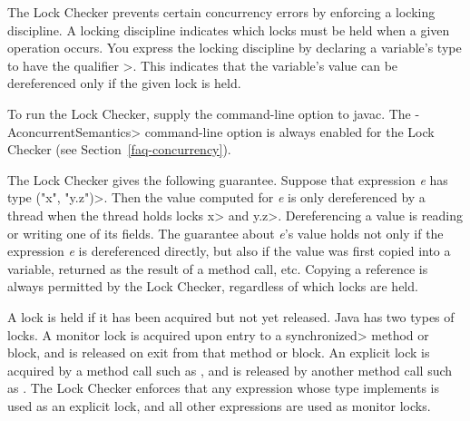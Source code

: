 
The Lock Checker prevents certain concurrency errors by enforcing a
locking discipline.  A locking discipline indicates which locks must be held
when a given operation occurs.  You express the locking discipline by
declaring a variable's type to have the qualifier
\<>.
This indicates that the variable's value can
be dereferenced only if the given lock is held.


To run the Lock Checker, supply the
command-line option to javac.  The \<-AconcurrentSemantics>
command-line option is always enabled for the Lock Checker (see Section~\ref{faq-concurrency}).



The Lock Checker gives the following guarantee.
Suppose that expression \textit{e} has type
\<(\ttlcb"x", "y.z"\ttrcb)>.
Then the value computed for \textit{e} is only dereferenced by a thread when the
thread holds locks \<x> and \<y.z>.
Dereferencing a value is reading or writing one of its fields.
The guarantee about \textit{e}'s value
holds not only if the expression \textit{e} is dereferenced
directly, but also if the value was first copied into a variable,
returned as the
result of a method call, etc.
Copying a reference is always
permitted by the Lock Checker, regardless of which locks are held.

A lock is held if it has been acquired but not yet released.
Java has two types of locks.
A monitor lock is acquired upon entry to a \<synchronized> method or block,
and is released on exit from that method or block.
An explicit lock is acquired by a method call such as
,
and is released by another method call such as
.
The Lock Checker enforces that any expression whose type implements
 is used as an
explicit lock, and all other expressions are used as monitor locks.

